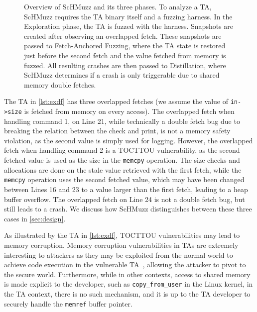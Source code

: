 \documentclass[conference]{IEEEtran} %
\newcommand{\sysname}{ScHMuzz\xspace}
\newcommand{\stageone}{Exploration\xspace}
\newcommand{\stagetwo}{Fetch-Anchored Fuzzing\xspace} %
\newcommand{\stagethree}{Distillation\xspace}
\begin{document}
\begin{figure}[h!]
  \centering
  
  \caption{
    Overview of \sysname and its three phases. To analyze a TA, \sysname requires the TA binary itself and a fuzzing harness. In the \stageone phase, the TA is fuzzed with the harness. Snapshots are created after observing an overlapped fetch. These snapshots are passed to \stagetwo, where the TA state is restored just before the second fetch and the value fetched from memory is fuzzed. All resulting crashes 
    are then passed to \stagethree, where \sysname determines if a crash is only triggerable due to shared memory double fetches.
    }
  \label{fig:overview}
\end{figure}

The TA in \autoref{lst:exdf} has three overlapped fetches (we assume the value of \texttt{in->size} is fetched from memory 
on every access). The overlapped
fetch when handling command 1, on Line 21, while technically a double fetch bug due to breaking the relation 
between the check and print, is not a memory safety violation, as the second value is simply 
used for logging. However, the overlapped fetch when handling command 2 is a TOCTTOU vulnerability, as the 
second fetched value is used as the size in the \texttt{memcpy} operation. The size checks and allocations are done on the 
stale value retrieved with the first fetch, while the \texttt{memcpy} operation uses the second fetched 
value, which may have been changed between Lines 16 and 23 to a value larger than 
the first fetch, leading to a heap buffer overflow. The overlapped fetch on Line 24 is not a 
double fetch bug, but still leads to a crash. We discuss how \sysname distinguishes between 
these three cases in \autoref{sec:design}.

As illustrated by the TA in \autoref{lst:exdf}, TOCTTOU vulnerabilities may lead to memory 
corruption. Memory corruption vulnerabilities in TAs are extremely interesting 
to attackers as they may be exploited from the normal world to achieve code execution 
in the vulnerable TA~\cite{fiasccco,beniaini2017trustissues,berard2018kinibi,busch2020finding,rollback,globalconfusion,Komaromy2021UnboxYourPhone,Li2024DiveIntoAndroidTA,AdamskiGuilbonPeterlin2019SamsungTrustZone,Makkaveev2019TrustZoneFuzzing,AdamTC}, allowing the attacker to pivot to the secure world.
Furthermore, while in other contexts, access to shared memory is made explicit to 
the developer, such as \texttt{copy\_from\_user} in the Linux kernel, in the TA 
context, there is no such mechanism, and it is up to the TA developer to securely  
handle the \texttt{memref} buffer pointer. 
\end{document}
